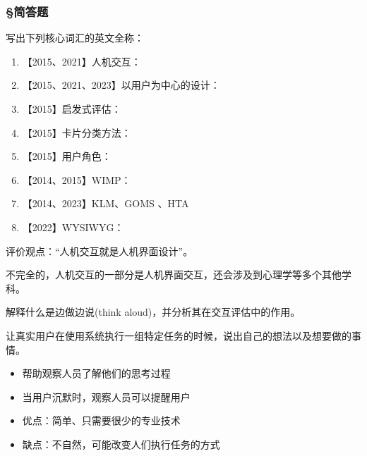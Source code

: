 \subsubsection*{\S 简答题}
\setcounter{problemname}{0}

\begin{problem}
写出下列核心词汇的英文全称：
\begin{enumerate}[label=(\arabic*)]
    \item 【2015、2021】人机交互：
    \item 【2015、2021、2023】以用户为中心的设计：
    \item 【2015】启发式评估：
    \item 【2015】卡片分类方法：
    \item 【2015】用户角色：
    \item 【2014、2015】WIMP：
    \item 【2014、2023】KLM、GOMS 、HTA
    \item 【2022】WYSIWYG：
\end{enumerate}
\end{problem}
\vspace{0.25em}


\begin{problem}[2015]
评价观点：“人机交互就是人机界面设计”。
\end{problem}

\begin{solution}
不完全的，人机交互的一部分是人机界面交互，还会涉及到心理学等多个其他学科。
\end{solution}



\begin{problem}[2015、2016]
解释什么是边做边说(think aloud)，并分析其在交互评估中的作用。
\end{problem}

\begin{solution}
让真实用户在使用系统执行一组特定任务的时候，说出自己的想法以及想要做的事情。

\vspace{-0.8em}
\begin{multicols}{2}
    \begin{itemize}
        \item 帮助观察人员了解他们的思考过程
        \item 当用户沉默时，观察人员可以提醒用户
        \item 优点：简单、只需要很少的专业技术
        \item 缺点：不自然，可能改变人们执行任务的方式
    \end{itemize}
\end{multicols}
\vspace{-1em}
\end{solution}



